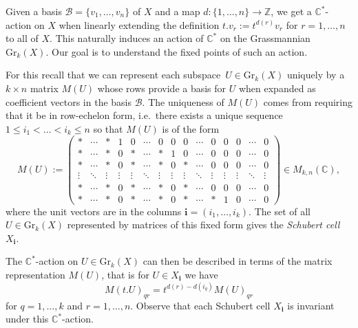 \documentclass[smallextended,envcountsect,envcountsame]{svjour3}
\numberwithin{equation}{section}
\newcommand{\C}{\mathbb{C}}
\newcommand{\CC}{\mathbb{C}}
\newcommand{\ZZ}{\mathbb{Z}}
\newcommand{\bfi}{\mathbf{i}}
\newcommand{\Gr}{\mathrm{Gr}}
\begin{document}
Given a basis $\mathcal B=\{v_1,\ldots,v_n\}$ of $X$ and a map $d:\{1,\ldots,n\}\to\ZZ$, we get a $\C^\ast$-action on $X$ when linearly extending the definition $t.v_r:=t^{d(r)}v_r$ for $r=1,\ldots,n$ to all of $X$.
This naturally induces an action of $\C^\ast$ on the Grassmannian $\Gr_k(X)$.
Our goal is to understand the fixed points of such an action.

For this recall that we can represent each subspace~$U\in\Gr_k(X)$ uniquely by a $k\times n$ matrix $M(U)$ whose rows provide a basis for $U$ when expanded as coefficient vectors in the basis $\mathcal B$.
The uniqueness of $M(U)$ comes from requiring that it be in row-echelon form, i.e.\ there exists a unique sequence $1\leq i_1<\ldots<i_k\leq n$ so that $M(U)$ is of the form
\[M(U):=
  \begin{pmatrix}
    \ast&\cdots &\ast &1&0 &\cdots& 0 & 0 & 0 &\cdots&0&0&0&\cdots&0\\
    \ast&\cdots &\ast&0&\ast&\cdots &\ast&1&0&\cdots&0&0&0&\cdots&0\\
    \ast &\cdots&\ast&0&\ast &\cdots&\ast&0&\ast&\cdots&0&0&0&\cdots&0\\[-0.4em]
    \vdots &\ddots&\vdots&\vdots&\vdots &\ddots&\vdots&\vdots&\vdots&\ddots&\vdots&\vdots&\vdots&\ddots&\vdots\\
    \ast&\cdots &\ast&0&\ast&\cdots &\ast&0&\ast&\cdots&0&0&0&\cdots&0\\
    \ast&\cdots &\ast&0&\ast&\cdots &\ast&0&\ast&\cdots&\ast&1&0&\cdots&0
  \end{pmatrix}\in M_{k,n}(\CC),\]
where the unit vectors are in the columns $\bfi=(i_1,\ldots,i_k)$.
The set of all $U\in\Gr_k(X)$ represented by matrices of this fixed form gives the \emph{Schubert cell} $X_\bfi$.

The $\C^\ast$-action on $U\in\Gr_k(X)$ can then be described in terms of the matrix representation $M(U)$, that is for $U\in X_\bfi$ we have
\[M(t.U)_{qr}=t^{d(r)-d(i_q)} M(U)_{qr}\]
for $q=1,\ldots,k$ and $r=1,\ldots,n$.
Observe that each Schubert cell $X_\bfi$ is invariant under this $\CC^*$-action.
\end{document}
